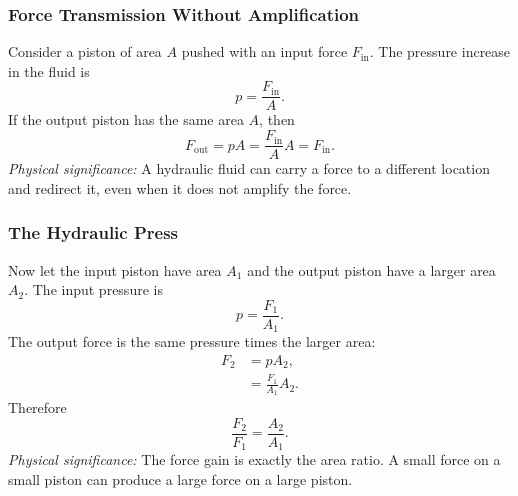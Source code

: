\documentclass[../main.tex]{subfiles}
\begin{document}
\subsubsection{Force Transmission Without Amplification}\label{subsec:lec11:force-transmission}
Consider a piston of area $A$ pushed with an input force $F_{\mathrm{in}}$. The pressure increase in the fluid is
\begin{equation}
  p=\frac{F_{\mathrm{in}}}{A}.
  \label{eq:lec11_input_pressure_same_area}
\end{equation}
If the output piston has the same area $A$, then
\begin{equation}
  F_{\mathrm{out}}=pA
  =
  \frac{F_{\mathrm{in}}}{A}A
  =
  \boxed{F_{\mathrm{in}}.}
  \label{eq:lec11_same_area_force}
\end{equation}
\textit{Physical significance:} A hydraulic fluid can carry a force to a different location and redirect it, even when it does not amplify the force.

\subsubsection{The Hydraulic Press}\label{subsec:lec11:hydraulic-press}
Now let the input piston have area $A_1$ and the output piston have a larger area $A_2$. The input pressure is
\begin{equation}
  p=\frac{F_1}{A_1}.
  \label{eq:lec11_press_pressure}
\end{equation}
The output force is the same pressure times the larger area:
\begin{align}
  F_2 &= pA_2,
  \label{eq:lec11_press_force_1}\\
      &= \frac{F_1}{A_1}A_2.
  \label{eq:lec11_press_force_2}
\end{align}
Therefore
\begin{equation}
  \boxed{\frac{F_2}{F_1}=\frac{A_2}{A_1}.}
  \label{eq:lec11_force_amplification}
\end{equation}
\textit{Physical significance:} The force gain is exactly the area ratio. A small force on a small piston can produce a large force on a large piston.

\begin{center}
\end{center}
\end{document}
